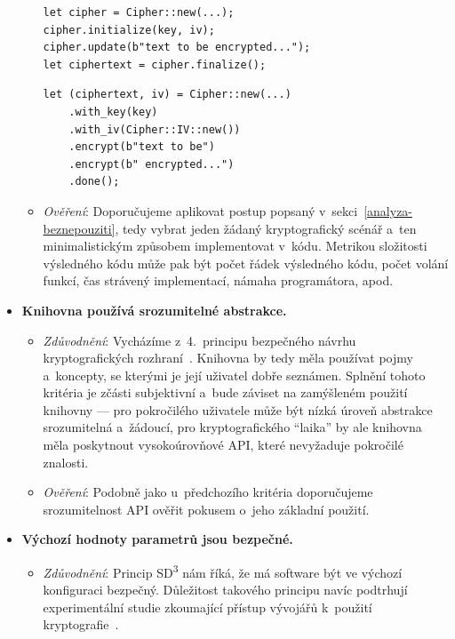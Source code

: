 \begin{itemize}
\begin{itemize}[beginpenalty=10000]
\begin{lstlisting}[caption={~Tradiční rozhraní pro symetrické šifrování},label={lst:cryptoapi-classic},float]
let cipher = Cipher::new(...);
cipher.initialize(key, iv);
cipher.update(b"text to be encrypted...");
let ciphertext = cipher.finalize();
\end{lstlisting}

\begin{lstlisting}[caption={~Fluentní rozhraní pro symetrické šifrování},label={lst:cryptoapi-fluent},float]
let (ciphertext, iv) = Cipher::new(...)
    .with_key(key)
    .with_iv(Cipher::IV::new())
    .encrypt(b"text to be")
    .encrypt(b" encrypted...")
    .done();
\end{lstlisting}

        \item \textit{Ověření}: Doporučujeme aplikovat postup popsaný v~sekci~\ref{analyza-beznepouziti}, tedy vybrat jeden žádaný kryptografický scénář a~ten minimalistickým způsobem implementovat v~kódu. Metrikou složitosti výsledného kódu může pak být počet řádek výsledného kódu, počet volání funkcí, čas strávený implementací, námaha programátora, apod.
    \end{itemize}
    
    \item \textbf{Knihovna používá srozumitelné abstrakce.} 
    \begin{itemize}[beginpenalty=10000]
        \item \textit{Zdůvodnění}: Vycházíme z~4.~principu bezpečného návrhu kryptografických rozhraní~\cite{greensmith}. Knihov\-na by tedy měla používat pojmy a~koncepty, se kterými je její uživatel dobře seznámen. Splnění tohoto kritéria je zčásti subjektivní a~bude záviset na zamýšleném použití knihovny --- pro pokročilého uživatele může být nízká úroveň abstrakce srozumitelná a~žádoucí, pro kryptografického ``laika'' by ale knihovna měla poskytnout vysokoúrovňové API, které nevyžaduje pokročilé znalosti.

        \item \textit{Ověření}: Podobně jako u~předchozího kritéria doporučujeme srozumitelnost API ověřit pokusem o~jeho základní použití.
    \end{itemize}
    
    \item \textbf{Výchozí hodnoty parametrů jsou bezpečné.} 
    \begin{itemize}[beginpenalty=10000]
        \item \textit{Zdůvodnění}: Princip SD\textsuperscript{3} nám říká, že má software být ve výchozí konfiguraci bezpečný. Důležitost takového principu navíc podtrhují experimentální studie zkoumající přístup vývojářů k~použití kryptografie~\cite{rustcryptoapis}.


\end{itemize}
\end{itemize}
